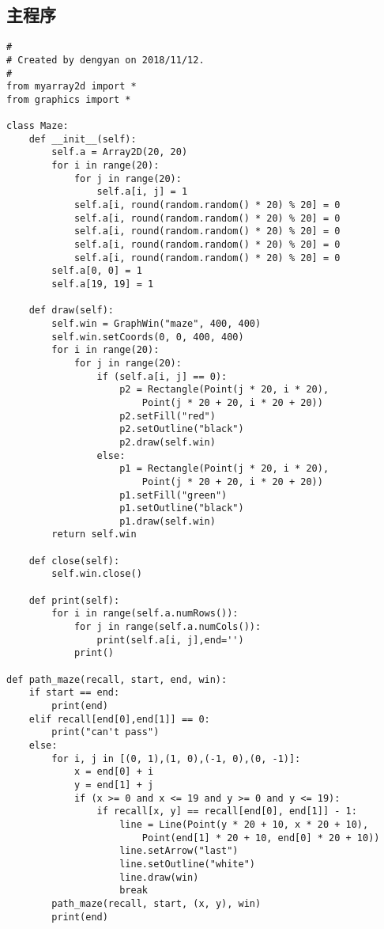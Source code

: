 \documentclass[12pt,a4paper]{article}
\begin{document}
\subsection{主程序}
\begin{verbatim}
#
# Created by dengyan on 2018/11/12.
#
from myarray2d import *
from graphics import *

class Maze:
    def __init__(self):
        self.a = Array2D(20, 20)
        for i in range(20):
            for j in range(20):
                self.a[i, j] = 1
            self.a[i, round(random.random() * 20) % 20] = 0
            self.a[i, round(random.random() * 20) % 20] = 0
            self.a[i, round(random.random() * 20) % 20] = 0
            self.a[i, round(random.random() * 20) % 20] = 0
            self.a[i, round(random.random() * 20) % 20] = 0
        self.a[0, 0] = 1
        self.a[19, 19] = 1

    def draw(self):
        self.win = GraphWin("maze", 400, 400)
        self.win.setCoords(0, 0, 400, 400)
        for i in range(20):
            for j in range(20):
                if (self.a[i, j] == 0):
                    p2 = Rectangle(Point(j * 20, i * 20),
                        Point(j * 20 + 20, i * 20 + 20))
                    p2.setFill("red")
                    p2.setOutline("black")
                    p2.draw(self.win)
                else:
                    p1 = Rectangle(Point(j * 20, i * 20), 
                        Point(j * 20 + 20, i * 20 + 20))
                    p1.setFill("green")
                    p1.setOutline("black")
                    p1.draw(self.win)
        return self.win

    def close(self):
        self.win.close()

    def print(self):
        for i in range(self.a.numRows()):
            for j in range(self.a.numCols()):
                print(self.a[i, j],end='')
            print()

def path_maze(recall, start, end, win):
    if start == end:
        print(end)
    elif recall[end[0],end[1]] == 0:
        print("can't pass")
    else:
        for i, j in [(0, 1),(1, 0),(-1, 0),(0, -1)]:
            x = end[0] + i
            y = end[1] + j
            if (x >= 0 and x <= 19 and y >= 0 and y <= 19):
                if recall[x, y] == recall[end[0], end[1]] - 1:
                    line = Line(Point(y * 20 + 10, x * 20 + 10),
                        Point(end[1] * 20 + 10, end[0] * 20 + 10))
                    line.setArrow("last")
                    line.setOutline("white")
                    line.draw(win)
                    break
        path_maze(recall, start, (x, y), win)
        print(end)




\end{verbatim}
\end{document}
